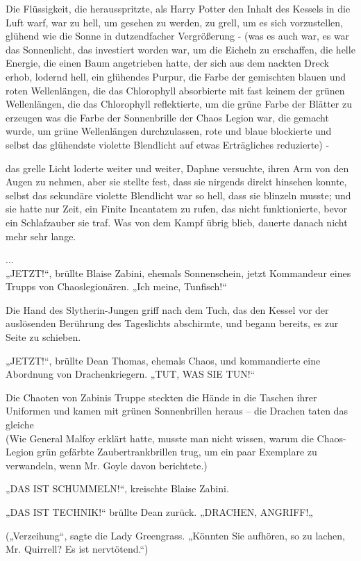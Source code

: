{Die Flüssigkeit, die herausspritzte, als Harry Potter den Inhalt des Kessels in die Luft warf, war zu hell, um gesehen zu werden, zu grell, um es sich vorzustellen, glühend wie die Sonne in dutzendfacher Vergrößerung - (was es auch war, es war das Sonnenlicht, das investiert worden war, um die Eicheln zu erschaffen, die helle Energie, die einen Baum angetrieben hatte, der sich aus dem nackten Dreck erhob, lodernd hell, ein glühendes Purpur, die Farbe der gemischten blauen und roten Wellenlängen, die das Chlorophyll absorbierte mit fast keinem der grünen Wellenlängen, die das Chlorophyll reflektierte, um die grüne Farbe der Blätter zu erzeugen was die Farbe der Sonnenbrille der Chaos Legion war, die gemacht wurde, um grüne Wellenlängen durchzulassen, rote und blaue blockierte und selbst das glühendste violette Blendlicht auf etwas Erträgliches reduzierte) -

das grelle Licht loderte weiter und weiter, Daphne versuchte, ihren Arm von den Augen zu nehmen, aber sie stellte fest, dass sie nirgends direkt hinsehen konnte, selbst das sekundäre violette Blendlicht war so hell, dass sie blinzeln musste; und sie hatte nur Zeit, ein Finite Incantatem zu rufen, das nicht funktionierte, bevor ein Schlafzauber sie traf. Was von dem Kampf übrig blieb, dauerte danach nicht mehr sehr lange.

...\\ „JETZT!“, brüllte Blaise Zabini, ehemals Sonnenschein, jetzt Kommandeur eines Trupps von Chaoslegionären. „Ich meine, Tunfisch!“

Die Hand des Slytherin-Jungen griff nach dem Tuch, das den Kessel vor der auslösenden Berührung des Tageslichts abschirmte, und begann bereits, es zur Seite zu schieben.

„JETZT!“, brüllte Dean Thomas, ehemals Chaos, und kommandierte eine Abordnung von Drachenkriegern. „TUT, WAS SIE TUN!“

Die Chaoten von Zabinis Truppe steckten die Hände in die Taschen ihrer Uniformen und kamen mit grünen Sonnenbrillen heraus -- die Drachen taten das gleiche\\ (Wie General Malfoy erklärt hatte, musste man nicht wissen, warum die Chaos-Legion grün gefärbte Zaubertrankbrillen trug, um ein paar Exemplare zu verwandeln, wenn Mr. Goyle davon berichtete.)

„DAS IST SCHUMMELN!“, kreischte Blaise Zabini.

„DAS IST TECHNIK!“ brüllte Dean zurück. „DRACHEN, ANGRIFF!„

(„Verzeihung“, sagte die Lady Greengrass. „Könnten Sie aufhören, so zu lachen, Mr. Quirrell? Es ist nervtötend.“)

}
